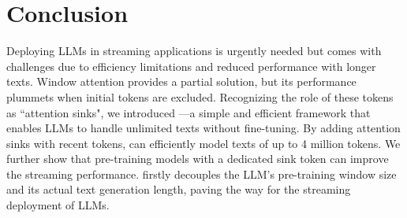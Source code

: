 \section{Conclusion}
Deploying LLMs in streaming applications is urgently needed but comes with challenges due to efficiency limitations and reduced performance with longer texts. Window attention provides a partial solution, but its performance plummets when initial tokens are excluded. Recognizing the role of these tokens as ``attention sinks", we introduced \method—a simple and efficient framework that enables LLMs to handle unlimited texts without fine-tuning. By adding attention sinks with recent tokens, \method can efficiently model texts of up to 4 million tokens. We further show that pre-training models with a dedicated sink token can improve the streaming performance. \method firstly decouples the LLM's pre-training window size and its actual text generation length, paving the way for the streaming deployment of LLMs.





